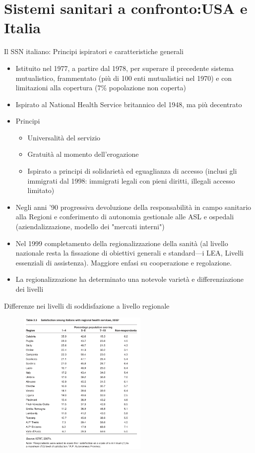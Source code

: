 \documentclass[aspectratio=149,11pt]{beamer}
\begin{document}
\section{Sistemi sanitari a confronto:\newline USA e Italia}

\begin{frame}{Il SSN italiano: Principi ispiratori e caratteristiche generali}
\begin{itemize}
\item Istituito nel 1977, a partire dal 1978, per superare il precedente sistema
mutualistico, frammentato (più di 100 enti mutualistici nel 1970) e con
limitazioni alla copertura (7\% popolazione non coperta)
\item Ispirato al National Health Service britannico del 1948, ma più decentrato
\item Principi
\begin{itemize}
\item Universalità del servizio
\item Gratuità al momento dell'erogazione
\item Ispirato a principi di solidarietà ed eguaglianza di accesso (inclusi gli
immigrati dal 1998: immigrati legali con pieni diritti, illegali accesso limitato)
\end{itemize}
\item Negli anni '90 progressiva devoluzione della responsabilità in campo
sanitario alla Regioni e conferimento di autonomia gestionale alle ASL e
ospedali (aziendalizzazione, modello dei "mercati interni")
\item Nel 1999 completamento della regionalizzazione della sanità (al livello
nazionale resta la fissazione di obiettivi generali e standard---i LEA,
Livelli essenziali di assistenza). Maggiore enfasi su cooperazione e
regolazione.
\item La regionalizzazione ha determinato una notevole varietà e differenziazione
dei livelli
\end{itemize}
\end{frame}
\begin{frame}{Differenze nei livelli di soddisfazione a livello regionale}
\begin{figure}[htbp]
\centering
\includegraphics[height=7cm]{./figure/soddisfazione-sanita-italiana-regioni.pdf}
\end{figure}
\end{frame}
\end{document}
